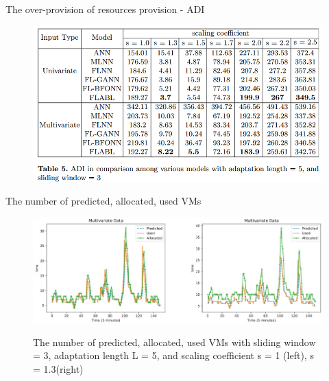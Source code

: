\documentclass{beamer}
\begin{document}
\begin{frame}{The over-provision of resources provision - ADI}
	\begin{figure}
		\includegraphics[width=1.0 \textwidth]{true/auto_scaler2.png} %
		\label{fig:forecasting_results}			
	\end{figure}
\end{frame}


\begin{frame}{The number of predicted, allocated, used VMs }
	\begin{figure}
		\includegraphics[width=1.0 \textwidth]{true/vms.png} %
		\label{fig:forecasting_results}		
		\caption{The number of predicted, allocated, used VMs with sliding window = 3, adaptation length L = 5, and scaling coefficient s = 1 (left), s = 1.3(right)}	
	\end{figure}
\end{frame}
\end{document}
